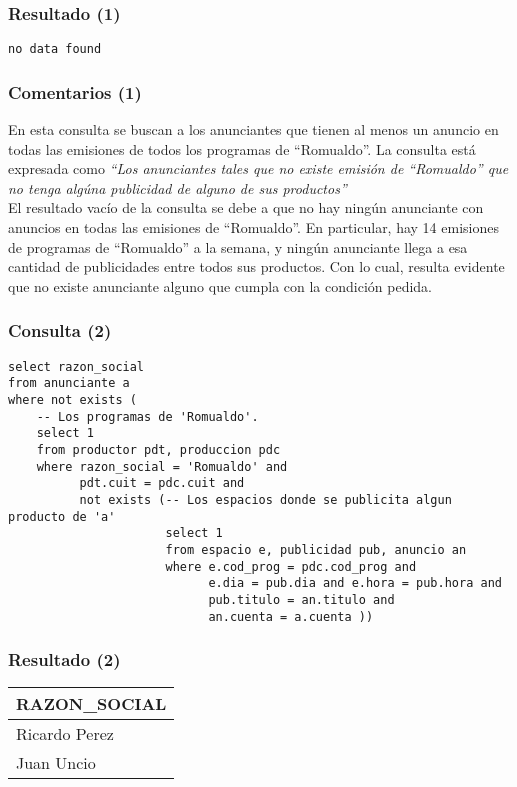 \subsubsection*{Resultado (1)}
\texttt{no data found}

\subsubsection*{Comentarios (1)}
En esta consulta se buscan a los anunciantes que tienen al menos un anuncio en todas las emisiones de todos los programas de ``Romualdo''. La consulta está expresada como \textit{``Los anunciantes tales que no existe emisión de ``Romualdo'' que no tenga algúna publicidad de alguno de sus productos''} \\

El resultado vacío de la consulta se debe a que no hay ningún anunciante con anuncios en todas las emisiones de ``Romualdo''. En particular, hay 14 emisiones de programas de ``Romualdo'' a la semana, y ningún anunciante llega a esa cantidad de publicidades entre todos sus productos. Con lo cual, resulta evidente que no existe anunciante alguno que cumpla con la condición pedida. \\

\subsubsection*{Consulta (2)}

\begin{lstlisting} 
select razon_social
from anunciante a
where not exists (
    -- Los programas de 'Romualdo'.
    select 1
    from productor pdt, produccion pdc
    where razon_social = 'Romualdo' and
          pdt.cuit = pdc.cuit and 
          not exists (-- Los espacios donde se publicita algun producto de 'a'
                      select 1 
                      from espacio e, publicidad pub, anuncio an
                      where e.cod_prog = pdc.cod_prog and
                            e.dia = pub.dia and e.hora = pub.hora and
                            pub.titulo = an.titulo and
                            an.cuenta = a.cuenta ))
\end{lstlisting}

\subsubsection*{Resultado (2)}
\begin{tabular}{|l|}
  \hline
    \bf{RAZON\_SOCIAL} \\ 
  \hline
    Ricardo Perez \\ 
    Juan Uncio \\
  \hline
\end{tabular} 

